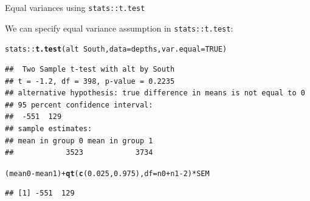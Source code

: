 \documentclass[10pt,handout]{beamer}\usepackage[]{graphicx}\usepackage[]{color}
\makeatletter
\newcommand{\hlnum}[1]{\textcolor[rgb]{0.686,0.059,0.569}{#1}}%
\newcommand{\hlopt}[1]{\textcolor[rgb]{0,0,0}{#1}}%
\newcommand{\hlstd}[1]{\textcolor[rgb]{0.345,0.345,0.345}{#1}}%
\newcommand{\hlkwc}[1]{\textcolor[rgb]{0.333,0.667,0.333}{#1}}%
\newcommand{\hlkwd}[1]{\textcolor[rgb]{0.737,0.353,0.396}{\textbf{#1}}}%
\newenvironment{kframe}{%
 \def\at@end@of@kframe{}%
 \ifinner\ifhmode%
  \def\at@end@of@kframe{\end{minipage}}%
  \begin{minipage}{\columnwidth}%
 \fi\fi%
 \def\FrameCommand##1{\hskip\@totalleftmargin \hskip-\fboxsep
 \colorbox{shadecolor}{##1}\hskip-\fboxsep
     \hskip-\linewidth \hskip-\@totalleftmargin \hskip\columnwidth}%
 \MakeFramed {\advance\hsize-\width
   \@totalleftmargin\z@ \linewidth\hsize
   \@setminipage}}%
 {\par\unskip\endMakeFramed%
 \at@end@of@kframe}
\newenvironment{knitrout}{}{} %
\makeatother
\begin{document}
\begin{frame}[fragile]{Equal variances using \texttt{stats::t.test}}
	
	We can specify equal variance assumption in \texttt{stats::t.test}:
	
\begin{knitrout}\scriptsize
{}\color{fgcolor}\begin{kframe}
\begin{alltt}
\hlstd{stats}\hlopt{::}\hlkwd{t.test}\hlstd{(alt} \hlopt{~} \hlstd{South,} \hlkwc{data} \hlstd{= depths,} \hlkwc{var.equal} \hlstd{=} \hlnum{TRUE}\hlstd{)}
\end{alltt}
\begin{verbatim}
##  Two Sample t-test with alt by South 
## t = -1.2, df = 398, p-value = 0.2235
## alternative hypothesis: true difference in means is not equal to 0 
## 95 percent confidence interval:
##  -551  129 
## sample estimates:
## mean in group 0 mean in group 1 
##            3523            3734
\end{verbatim}
\begin{alltt}
\hlstd{(mean0} \hlopt{-} \hlstd{mean1)} \hlopt{+} \hlkwd{qt}\hlstd{(}\hlkwd{c}\hlstd{(}\hlnum{0.025}\hlstd{,} \hlnum{0.975}\hlstd{),} \hlkwc{df} \hlstd{= n0} \hlopt{+} \hlstd{n1} \hlopt{-} \hlnum{2}\hlstd{)} \hlopt{*} \hlstd{SEM}
\end{alltt}
\begin{verbatim}
## [1] -551  129
\end{verbatim}
\end{kframe}
\end{knitrout}
	
	
\end{frame}




\end{document}
